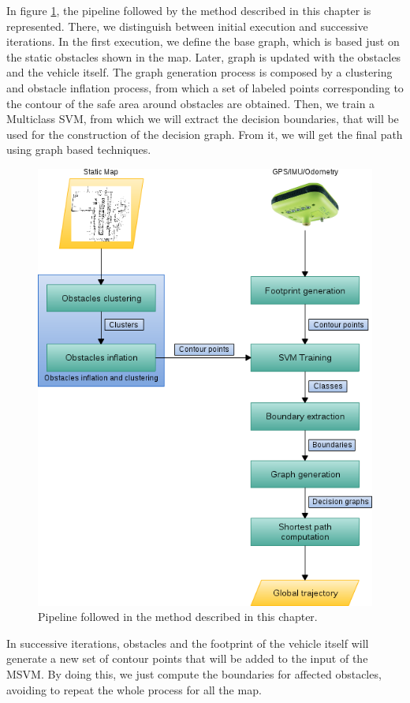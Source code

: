In figure \ref{fig:cp06_pipeline}, the pipeline followed by the method described in this chapter is represented. There, we distinguish between initial execution and successive iterations. In the first execution, we define the base graph, which is based just on the static obstacles shown in the map. Later, graph is updated with the obstacles and the vehicle itself. The graph generation process is composed by a clustering and obstacle inflation process, from which a set of labeled points corresponding to the contour of the safe area around obstacles are obtained. Then, we train a Multiclass \ac{SVM}, from which we will extract the decision boundaries, that will be used for the construction of the decision graph. From it, we will get the final path using graph based techniques.

\begin{figure}[h!]
      \centering
      \includegraphics[width=\textwidth, height=\textwidth]{pipeline}
      \caption{ Pipeline followed in the method described in this chapter. }      
      \label{fig:cp06_pipeline}
\end{figure}

In successive iterations, obstacles and the footprint of the vehicle itself will generate a new set of contour points that will be added to the input of the \ac{MSVM}. By doing this, we just compute the boundaries for affected obstacles, avoiding to repeat the whole process for all the map.

